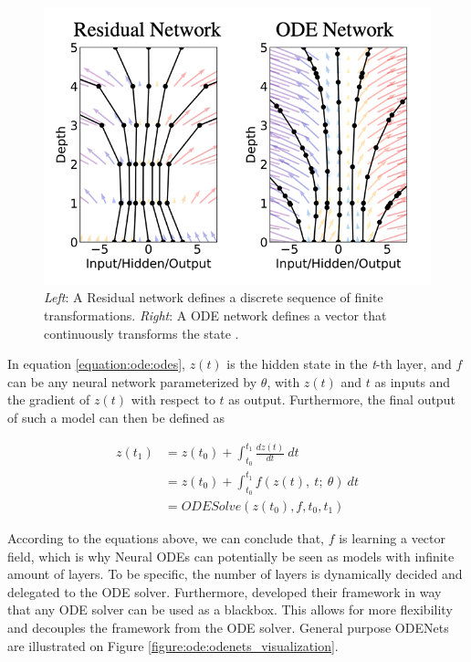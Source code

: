 \begin{figure}[ht]
      \centering
      \includegraphics[width=0.7\columnwidth]{figures/resnet_vs_odes.png}
      \caption{\emph{Left}: A Residual network defines a discrete sequence of finite transformations. \emph{Right}: A ODE network defines a vector that continuously transforms the state \citep{chen2018neural}.}
      \label{figure:ode:resnet_vs_ode}
\end{figure}

In equation \ref{equation:ode:odes}, $ z(t) $ is the hidden state in the \emph{t}-th layer, and $ f $ can be any neural network parameterized by $ \theta $, with $ z(t) $ and $ t $ as inputs and the gradient of $ z(t) $ with respect to $ t $ as output. Furthermore, the final output of such a model can then be defined as

\begin{align}
    z(t_1) & = z(t_0) + \int_{t_0}^{t_1} \frac{d z(t)}{d t} \ dt \\
    & = z(t_0) + \int_{t_0}^{t_1} f(z(t), \ t; \ \theta ) \ dt \\
    & = ODESolve(z(t_0), f, t_0, t_1)
\end{align}

According to the equations above, we can conclude that, $ f $ is learning a vector field, which is why Neural ODEs can potentially be seen as models with infinite amount of layers. To be specific, the number of layers is dynamically decided and delegated to the ODE solver. Furthermore, \citet{chen2018neural} developed their framework in way that any ODE solver can be used as a blackbox. This allows for more flexibility and decouples the framework from the ODE solver. General purpose ODENets are illustrated on Figure \ref{figure:ode:odenets_visualization}.

